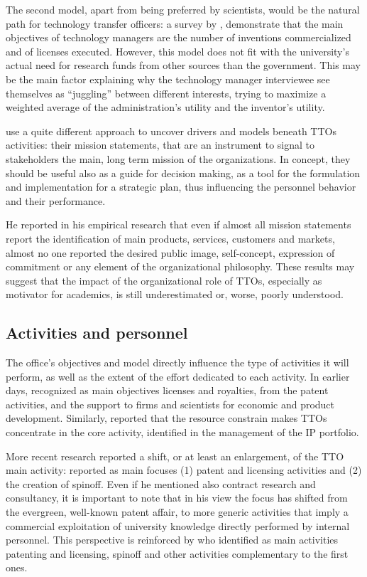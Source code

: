 The second model, apart from being preferred by scientists, would be the natural path for technology transfer officers: a survey by \citet{Jensen1998}, demonstrate that the main objectives of technology managers are the number of inventions commercialized and of licenses executed. However, this model does not fit with the university's actual need for research funds from other sources than the government. This may be the main factor explaining why the technology manager interviewee see themselves as \enquote{juggling} between different interests, trying to maximize a weighted average of the administration's utility and the inventor's utility.

\citet{Fitzgerald2015} use a quite different approach to uncover drivers and models beneath TTOs activities: their mission statements, that are an instrument to signal to stakeholders the main, long term mission of the organizations. In concept, they should be useful also as a guide for decision making, as a tool for the formulation and implementation for a strategic plan, thus influencing the personnel behavior and their performance.

He reported in his empirical research that even if almost all mission statements report the identification of main products, services, customers and markets, almost no one reported the desired public image, self-concept, expression of commitment or any element of the organizational philosophy. These results may suggest that the impact of the organizational role of TTOs, especially as motivator for academics, is still underestimated or, worse, poorly understood. 

\subsection{Activities and personnel}

The office's objectives and model directly influence the type of activities it will perform, as well as the extent of the effort dedicated to each activity. In earlier days,\citet{Siegel2003a} recognized as main objectives licenses and royalties, from the patent activities, and the support to firms and scientists for economic and product development. Similarly, \citet{OwenSmith2001} reported that the resource constrain makes TTOs concentrate in the core activity, identified in the management of the IP portfolio.

More recent research reported a shift, or at least an enlargement, of the TTO main activity: \citet{Geuna2009} reported as main focuses (1) patent and licensing activities and (2) the creation of spinoff. Even if he mentioned also contract research and consultancy, it is important to note that in his view the focus has shifted from the evergreen, well-known patent affair, to more generic activities that imply a commercial exploitation of university knowledge directly performed by internal personnel. This perspective is reinforced by \citet{Balderi2010} who identified as main activities patenting and licensing, spinoff and other activities complementary to the first ones.

